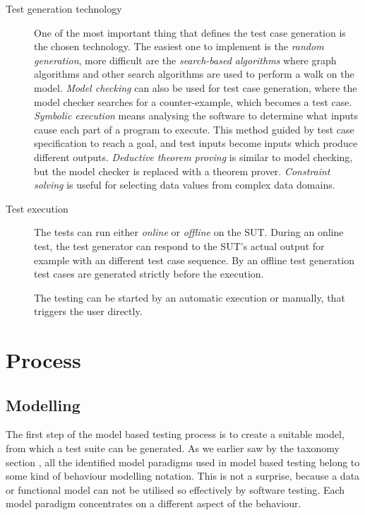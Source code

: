 \begin{description}
	\item[Test generation technology] One of the most important thing that defines the test case generation is the chosen technology. The easiest one to implement is the \textit{random generation}, more difficult are the \textit{search-based algorithms} where graph algorithms and other search algorithms are used to perform a walk on the model. \textit{Model checking} can also be used for test case generation, where the model checker searches for a counter-example, which becomes a test case. \textit{Symbolic execution} means analysing the software to determine what inputs cause each part of a program to execute. This method guided by test case specification to reach a goal, and test inputs become inputs which produce different outputs. \textit{Deductive theorem proving} is similar to model checking, but the model checker is replaced with a theorem prover. \textit{Constraint solving} is useful for selecting data values from complex data domains.
	
	\item[Test execution] The tests can run either \textit{online} or \textit{offline} on the SUT. During an online test, the test generator can respond to the SUT's actual output for example with an different test case sequence. By an offline test generation test cases are generated strictly before the execution.
	
	The testing can be started by an automatic execution or manually, that triggers the user directly.
\end{description}


\section{Process}
\label{sec:process}

\subsection{Modelling}
\label{sub:modelling}

The first step of the model based testing process is to create a suitable model, from which a test suite can be generated. As we earlier saw by the taxonomy section \cite{sec:taxonomy}, all the identified model paradigms used in model based testing belong to some kind of behaviour modelling notation. This is not a surprise, because a data or functional model can not be utilised so effectively by software testing. Each model paradigm concentrates on a different aspect of the behaviour.

